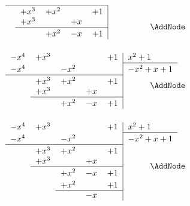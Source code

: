 \begin{NodesList}
\begin{align*}
\begin{minipage}[t]{0.5\textwidth}
\begin{tabular}{lllll|l}
\cline{1-5}
  \vrule height 2.5ex width 0pt &$+x^3$ & $+x^2$ &  &$+1$&  \\ 
 &$+x^3$& &$+x$&&  \\ 
\cline{2-5}
   \vrule height 2.5ex width 0pt&  &$+x^2$&$-x$&$+1$&  \\ 
\\
\end{tabular}
\end{minipage}&\AddNode\\
\begin{minipage}[t]{0.5\textwidth}
\begin{tabular}{lllll|l}
$-x^4$& $+x^3$ & \phantom{$-x^2$} & \phantom{$-x$} &$+1$&$ x^2+1$\\ 
\cline{6-6}
  \vrule height 2.5ex width 0pt $-x^4$& &$-x^2$  &  &&$-x^2+x+1$\\ 
\cline{1-5}
  \vrule height 2.5ex width 0pt &$+x^3$ & $+x^2$ &  &$+1$&  \\ 
 &$+x^3$& &$+x$&&  \\ 
\cline{2-5}
   \vrule height 2.5ex width 0pt&  &$+x^2$&$-x$&$+1$&  \\ 
\\
\end{tabular}
\end{minipage}&\AddNode\\
\begin{minipage}[t]{0.5\textwidth}
\begin{tabular}{lllll|l}
$-x^4$& $+x^3$ & \phantom{$-x^2$} & \phantom{$-x$} &$+1$&$ x^2+1$\\ 
\cline{6-6}
  \vrule height 2.5ex width 0pt $-x^4$& &$-x^2$  &  &&$-x^2+x+1$\\ 
\cline{1-5}
  \vrule height 2.5ex width 0pt &$+x^3$ & $+x^2$ &  &$+1$&  \\ 
 &$+x^3$& &$+x$&&  \\ 
\cline{2-5}
   \vrule height 2.5ex width 0pt&  &$+x^2$&$-x$&$+1$&  \\ 
   \vrule height 2.5ex width 0pt&  &$+x^2$&&$+1$&  \\ 
\cline{3-5}
 &  &  &$-x$&&  \\ 
\\
\end{tabular}
\end{minipage}&\AddNode\\
\end{align*}
\LinkNodes{\begin{minipage}{3.5cm}


\end{minipage}}
\end{NodesList}

